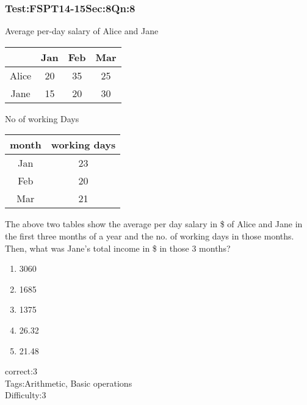 \documentclass[]{beamer}
\begin{document}
    \begin{frame}
	    \frametitle{Test:FSPT14-15\hspace{2mm}Sec:8\hspace{2mm}Qn:8}
	    \begin{center}
	    {Average per-day salary of Alice and Jane\\}
	    \begin{tabular}{c|c c c}
	    & Jan & Feb & Mar\\
	    \hline
	    Alice & 20 & 35 & 25\\
	    Jane & 15 & 20 & 30\\
	    \hline
	    \end{tabular}
	    \end{center}
	    \begin{center}
	    {No of working Days\\}
	    \begin{tabular}{c|c}
	    month & working days\\
	    \hline
	    Jan & 23\\
	    Feb & 20\\
	    Mar & 21
	    
	    \end{tabular}
	    \end{center}
	    The above two tables show the average per day salary in \$ of Alice and Jane in the first three months of a year and the no. of working days in those months. Then, what was Jane's total income in \$ in those 3 months?
	    \begin{enumerate}
	        \item
	           3060
	        \item
	           1685    
	        \item
	           1375
	        \item
	           26.32 
	        \item
	           21.48 
	    \end{enumerate}
	    correct:3  \\   
	    Tags:Arithmetic, Basic operations    \\
	    Difficulty:3   \\
    \end{frame}
\end{document}
